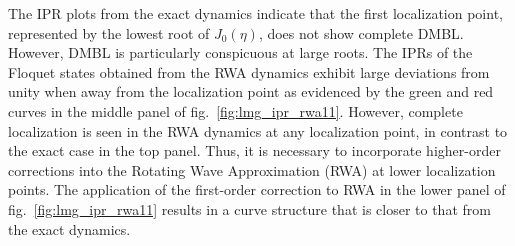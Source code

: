 \documentclass[%
reprint,
superscriptaddress,
amsmath,amssymb,
aps,
prb,
showkeys,
]{revtex4-2}
\begin{document}
The IPR plots from the exact dynamics indicate that the first localization point, represented by the lowest  root of $J_0(\eta)$, does not show complete DMBL. However, DMBL is particularly conspicuous at large roots. The IPRs of the Floquet states obtained from the RWA dynamics exhibit large deviations from unity when away from the localization point as evidenced by the green and red curves in the middle panel of fig.~\ref{fig:lmg_ipr_rwa11}. However, complete localization is seen in the RWA dynamics at any localization point, in contrast to the exact case in the top panel. Thus, it is necessary to incorporate  higher-order corrections into the Rotating Wave Approximation (RWA) at lower localization points. The application of the first-order correction to RWA in the lower panel of fig.~\ref{fig:lmg_ipr_rwa11} results in a curve structure that is closer to that from the exact dynamics.
\end{document}
